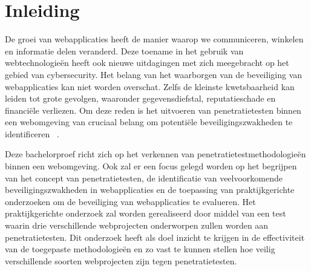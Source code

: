 


% 

\section{Inleiding}%
\label{sec:inleiding}

De groei van webapplicaties heeft de manier waarop we communiceren, winkelen en informatie delen veranderd. Deze toename in het gebruik
van webtechnologieën heeft ook nieuwe uitdagingen met zich meegebracht op het gebied van cybersecurity. Het belang van het waarborgen
van de beveiliging van webapplicaties kan niet worden overschat. Zelfs de kleinste kwetsbaarheid kan leiden tot grote gevolgen, waaronder gegevensdiefstal,
reputatieschade en financiële verliezen. Om deze reden is het uitvoeren van penetratietesten binnen een webomgeving van cruciaal
belang om potentiële beveiligingszwakheden te identificeren ~\autocite{Nagendran2019}. 

Deze bachelorproef richt zich op het verkennen
van penetratietestmethodologieën binnen een webomgeving. Ook zal er een focus gelegd worden op het begrijpen van het concept van penetratietesten,
de identificatie van veelvoorkomende beveiligingszwakheden in webapplicaties en de toepassing van praktijkgerichte onderzoeken om
de beveiliging van webapplicaties te evalueren. Het praktijkgerichte onderzoek zal worden gerealiseerd door middel van een test waarin drie
verschillende webprojecten onderworpen zullen worden aan penetratietesten. Dit onderzoek heeft als doel inzicht te krijgen in de effectiviteit van de
toegepaste methodologieën en zo vast te kunnen stellen hoe veilig verschillende soorten webprojecten zijn tegen penetratietesten.

